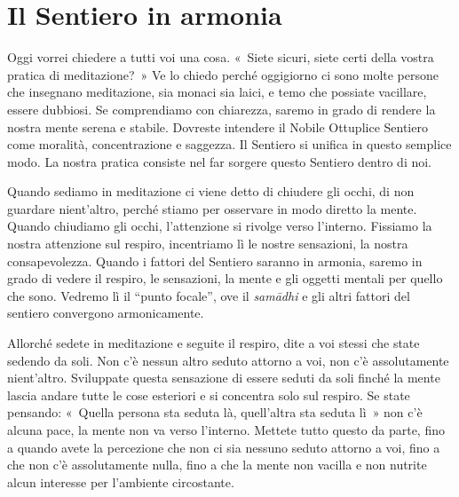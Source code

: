 \chapter{Il Sentiero in armonia}

Oggi vorrei chiedere a tutti voi una cosa. «~Siete sicuri, siete certi
della vostra pratica di meditazione?~» Ve lo chiedo perché oggigiorno ci
sono molte persone che insegnano meditazione, sia monaci sia laici, e
temo che possiate vacillare, essere dubbiosi. Se comprendiamo con
chiarezza, saremo in grado di rendere la nostra mente serena e stabile.
Dovreste intendere il Nobile Ottuplice Sentiero come moralità,
concentrazione e saggezza. Il Sentiero si unifica in questo semplice
modo. La nostra pratica consiste nel far sorgere questo Sentiero dentro
di noi.

Quando sediamo in meditazione ci viene detto di chiudere gli occhi, di
non guardare nient'altro, perché stiamo per osservare in modo diretto la
mente. Quando chiudiamo gli occhi, l'attenzione si rivolge verso
l'interno. Fissiamo la nostra attenzione sul respiro, incentriamo lì le
nostre sensazioni, la nostra consapevolezza. Quando i fattori del
Sentiero saranno in armonia, saremo in grado di vedere il respiro, le
sensazioni, la mente e gli oggetti mentali per quello che sono. Vedremo
lì il ``punto focale'', ove il \emph{samādhi} e gli altri fattori del
sentiero convergono armonicamente.

Allorché sedete in meditazione e seguite il respiro, dite a voi stessi
che state sedendo da soli. Non c'è nessun altro seduto attorno a voi,
non c'è assolutamente nient'altro. Sviluppate questa sensazione di
essere seduti da soli finché la mente lascia andare tutte le cose
esteriori e si concentra solo sul respiro. Se state pensando: «~Quella
persona sta seduta là, quell'altra sta seduta lì~» non c'è alcuna pace,
la mente non va verso l'interno. Mettete tutto questo da parte, fino a
quando avete la percezione che non ci sia nessuno seduto attorno a voi,
fino a che non c'è assolutamente nulla, fino a che la mente non vacilla
e non nutrite alcun interesse per l'ambiente circostante.

